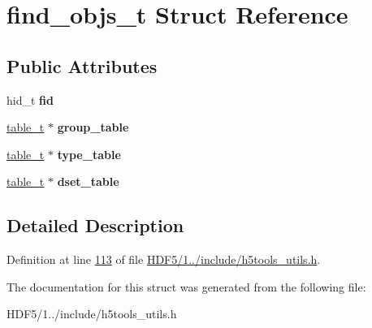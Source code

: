 \hypertarget{structfind__objs__t}{}\section{find\+\_\+objs\+\_\+t Struct Reference}
\label{structfind__objs__t}
\subsection*{Public Attributes}
\begin{DoxyCompactItemize}
\item 
\mbox{\label{structfind__objs__t_a6b086b9471ffa9855383738794274f04}} 
hid\+\_\+t {\bfseries fid}
\item 
\mbox{\label{structfind__objs__t_a5084ac70a8886d93c9174da034493c14}} 
\hyperlink{structtable__t}{table\+\_\+t} $\ast$ {\bfseries group\+\_\+table}
\item 
\mbox{\label{structfind__objs__t_a19ab508a6676d573874639451779eab9}} 
\hyperlink{structtable__t}{table\+\_\+t} $\ast$ {\bfseries type\+\_\+table}
\item 
\mbox{\label{structfind__objs__t_ac4024ca1e604b90e39a0a6d207c7e249}} 
\hyperlink{structtable__t}{table\+\_\+t} $\ast$ {\bfseries dset\+\_\+table}
\end{DoxyCompactItemize}


\subsection{Detailed Description}


Definition at line \hyperlink{_h_d_f5_21_810_81_2include_2h5tools__utils_8h_source_l00113}{113} of file \hyperlink{_h_d_f5_21_810_81_2include_2h5tools__utils_8h_source}{H\+D\+F5/1../include/h5tools\+\_\+utils.\+h}.



The documentation for this struct was generated from the following file\+:\begin{DoxyCompactItemize}
\item 
H\+D\+F5/1../include/h5tools\+\_\+utils.\+h\end{DoxyCompactItemize}
